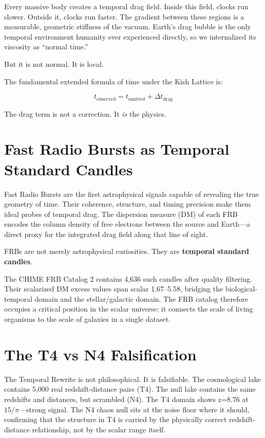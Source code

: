 \documentclass[11pt, letterpaper, openany]{book}
\begin{document}
Every massive body creates a temporal drag field. Inside this field, clocks run slower. Outside
it, clocks run faster. The gradient between these regions is a measurable, geometric stiffness
of the vacuum. Earth's drag bubble is the only temporal environment humanity ever experienced
directly, so we internalized its viscosity as ``normal time.''

But it is not normal.
It is local.

The fundamental extended formula of time under the Kish Lattice is:

\[
t_{\text{observed}} = t_{\text{emitted}} + \Delta t_{\text{drag}}
\]

The drag term is not a correction. It \emph{is} the physics.

\section*{Fast Radio Bursts as Temporal Standard Candles}

Fast Radio Bursts are the first astrophysical signals capable of revealing the true geometry
of time. Their coherence, structure, and timing precision make them ideal probes of temporal
drag. The dispersion measure (DM) of each FRB encodes the column density of free electrons
between the source and Earth---a direct proxy for the integrated drag field along that line
of sight.

FRBs are not merely astrophysical curiosities.
They are \textbf{temporal standard candles}.

The CHIME FRB Catalog 2 contains 4,636 such candles after quality filtering. Their scalarized
DM excess values span scalar 1.67--5.58, bridging the biological-temporal domain and the
stellar/galactic domain. The FRB catalog therefore occupies a critical position in the scalar
universe: it connects the scale of living organisms to the scale of galaxies in a single dataset.

\section*{The T4 vs N4 Falsification}

The Temporal Rewrite is not philosophical. It is falsifiable. The cosmological lake contains
5,000 real redshift-distance pairs (T4). The null lake contains the same redshifts and
distances, but scrambled (N4). The T4 domain shows z=8.76 at $15/\pi$---strong signal. The N4
chaos null sits at the noise floor where it should, confirming that the structure in T4 is
carried by the physically correct redshift-distance relationship, not by the scalar range itself.
\end{document}

